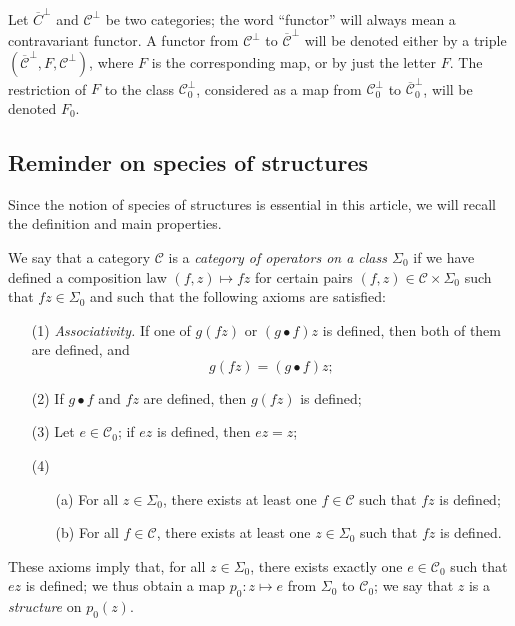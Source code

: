 \documentclass[a4paper,fleqn]{article}
\theoremstyle{plain}
\theoremstyle{definition}
\newenvironment{definition}[1]
  {\renewcommand\theinnerdefinition{#1}\innerdefinition}
  {\endinnerdefinition}
\newcommand{\CC}{\mathcal{C}}
\begin{document}
Let $\overline{C}^\perp$ and $\CC^\perp$ be two categories;
the word ``functor'' will always mean a contravariant functor.
A functor from $\CC^\perp$ to $\overline{\CC}^\perp$ will be denoted either by a triple $(\overline{\CC}^\perp,F,\CC^\perp)$, where $F$ is the corresponding map, or by just the letter $F$.
The restriction of $F$ to the class $\CC_0^\perp$, considered as a map from $\CC_0^\perp$ to $\overline{\CC}_0^\perp$, will be denoted $F_0$.



\subsection{Reminder on species of structures}
\label{section:i.2}

Since the notion of species of structures \cite{3a} is essential in this article, we will recall the definition and main properties.

\begin{definition}{1}
\label{definition:i-1}
  We say that a category $\CC$ is a \emph{category of operators on a class $\Sigma_0$} if we have defined a composition law $(f,z)\mapsto fz$ for certain pairs $(f,z)\in\CC\times\Sigma_0$ such that $fz\in\Sigma_0$ and such that the following axioms are satisfied:
  \begin{enumerate}
    \item[\normalfont(1)]
      \emph{Associativity.}
      If one of $g(fz)$ or $(g\bullet f)z$ is defined, then both of them are defined, and
      \[
        g(fz)
        = (g\bullet f)z;
      \]
    \item[\normalfont(2)]
      If $g\bullet f$ and $fz$ are defined, then $g(fz)$ is defined;
    \item[\normalfont(3)]
      Let $e\in\CC_0$;
      if $ez$ is defined, then $ez=z$;
    \item[\normalfont(4)]
      \begin{enumerate}
        \item[(a)]
          For all $z\in\Sigma_0$, there exists at least one $f\in\CC$ such that $fz$ is defined;
        \item[(b)]
          For all $f\in\CC$, there exists at least one $z\in\Sigma_0$ such that $fz$ is defined.
      \end{enumerate}
  \end{enumerate}
\end{definition}

These axioms imply that, for all $z\in\Sigma_0$, there exists exactly one $e\in\CC_0$ such that $ez$ is defined;
we thus obtain a map $p_0\colon z\mapsto e$ from $\Sigma_0$ to $\CC_0$;
we say that $z$ is a \emph{structure} on $p_0(z)$.
\end{document}
